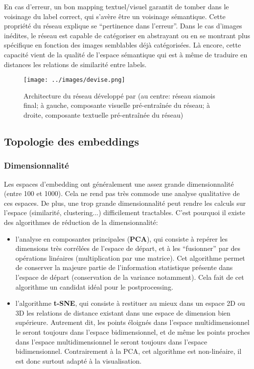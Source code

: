 \documentclass[french]{article}
\begin{document}
				En cas d'erreur, un bon mapping textuel/visuel garantit de tomber dans le voisinage du label correct, qui s'avère être un voisinage sémantique. Cette propriété du réseau explique se ``pertinence dans l'erreur''. Dans le cas d'images inédites, le réseau est capable de catégoriser en abstrayant ou en se montrant plus spécifique en fonction des images semblables déjà catégorisées. Là encore, cette capacité vient de la qualité de l'espace sémantique qui est à même de traduire en distances les relations de similarité entre labels.
				\begin{figure}[H]
					\centering
					\texttt{[image: ../images/devise.png]}
					\caption{Architecture du réseau développé par \cite{frome2013} (au centre: réseau siamois final; à gauche, composante visuelle pré-entraînée du réseau; à droite, composante textuelle pré-entraînée du réseau)}
				\end{figure}
			
		\subsection{Topologie des embeddings}
			\subsubsection{Dimensionnalité}
				Les espaces d'embedding ont généralement une assez grande dimensionnalité (entre 100 et 1000). Cela ne rend pas très commode une analyse qualitative de ces espaces. De plus, une trop grande dimensionnalité peut rendre les calculs sur l'espace (similarité, clustering...) difficilement tractables. C'est pourquoi il existe des algorithmes de réduction de la dimensionnalité:
				\begin{itemize}
					\item l'analyse en composantes principales (\textbf{PCA}), qui consiste à repérer les dimensions très corrélées de l'espace de départ, et à les ``fusionner'' par des opérations linéaires (multiplication par une matrice). Cet algorithme permet de conserver la majeure partie de l'information statistique présente dans l'espace de départ (conservation de la variance notamment). Cela fait de cet algorithme un candidat idéal pour le postprocessing.
					\item l'algorithme \textbf{t-SNE}, qui consiste à restituer au mieux dans un espace 2D ou 3D les relations de distance existant dans une espace de dimension bien supérieure. Autrement dit, les points éloignés dans l'espace multidimensionnel le seront toujours dans l'espace bidimensionnel, et de même les points proches dans l'espace multidimensionnel le seront toujours dans l'espace bidimensionnel. Contrairement à la PCA, cet algorithme est non-linéaire, il est donc surtout adapté à la visualisation.
				\end{itemize}
\end{document}
